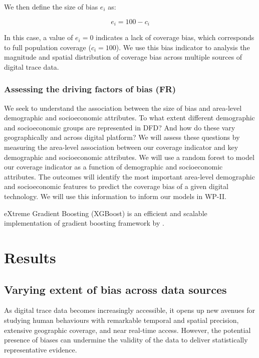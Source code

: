 \documentclass[]{rsos}%
\begin{document}
We then define the size of bias \(e_i\) as:

\begin{equation} \label{eq:size-bias}
e_i = 100 - c_i
\end{equation}

In this case, a value of \(e_i = 0\) indicates a lack of coverage bias,
which corresponds to full population coverage (\(c_i = 100\)). We use this
bias indicator to analysis the magnitude and spatial distribution of
coverage bias across multiple sources of digital trace data.

\subsubsection{Assessing the driving factors of bias (FR)}\label{assessing-the-driving-factors-of-bias-fr}

We seek to understand the association between the size of bias and
area-level demographic and socioeconomic attributes. To what extent
different demographic and socioeconomic groups are represented in DFD?
And how do these vary geographically and across digital platform? We
will assess these questions by measuring the area-level association
between our coverage indicator and key demographic and socioeconomic
attributes. We will use a random forest to model our coverage indicator
as a function of demographic and socioeconomic attributes. The outcomes
will identify the most important area-level demographic and
socioeconomic features to predict the coverage bias of a given digital
technology. We will use this information to inform our models in WP-II.

eXtreme Gradient Boosting (XGBoost) is an efficient and scalable
implementation of gradient boosting framework by \citep{friedman2001, friedman2000}.

\section{Results}\label{results}

\subsection{Varying extent of bias across data sources}\label{varying-extent-of-bias-across-data-sources}

As digital trace data becomes increasingly accessible, it opens up new
avenues for studying human behaviours with remarkable temporal and
spatial precision, extensive geographic coverage, and near real-time
access. However, the potential presence of biases can undermine the
validity of the data to deliver statistically representative evidence.
\end{document}
